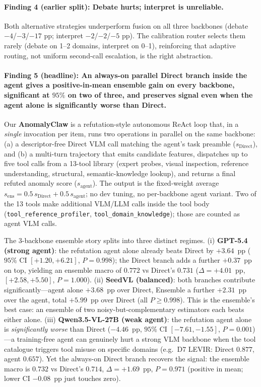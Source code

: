 \paragraph{Finding 4 (earlier split): Debate hurts; interpret is unreliable.}
Both alternative strategies underperform fusion on all three backbones (debate $-4$/$-3$/$-17$ pp; interpret $-2$/$-2$/$-5$ pp). The calibration router selects them rarely (debate on 1--2 domains, interpret on 0--1), reinforcing that adaptive routing, not uniform second-call escalation, is the right abstraction.

\paragraph{Finding 5 (headline): An always-on parallel Direct branch inside the agent gives a positive-in-mean ensemble gain on every backbone, significant at $95\%$ on two of three, and preserves signal even when the agent alone is significantly worse than Direct.}
\label{ssec:finding5}
Our \textbf{AnomalyClaw} is a refutation-style autonomous ReAct loop that, in a \emph{single} invocation per item, runs two operations in parallel on the same backbone: (a) a descriptor-free Direct VLM call matching the agent's task preamble ($s_{\mathrm{Direct}}$), and (b) a multi-turn trajectory that emits candidate features, dispatches up to five tool calls from a 13-tool library (expert probes, visual inspection, reference understanding, structural, semantic-knowledge lookup), and returns a final refuted anomaly score ($s_{\mathrm{agent}}$). The output is the fixed-weight average $s_{\mathrm{ens}} = 0.5\,s_{\mathrm{Direct}} + 0.5\,s_{\mathrm{agent}}$; no dev tuning, no per-backbone agent variant. Two of the 13 tools make additional VLM/LLM calls inside the tool body (\texttt{tool\_reference\_profiler}, \texttt{tool\_domain\_knowledge}); those are counted as agent VLM calls.

The 3-backbone ensemble story splits into three distinct regimes. (i) \textbf{GPT-5.4 (strong agent)}: the refutation agent alone already beats Direct by $+3.64$~pp ($95\%$ CI $[+1.20,+6.21]$, $P{=}0.998$); the Direct branch adds a further $+0.37$~pp on top, yielding an ensemble macro of $0.772$ vs Direct's $0.731$ ($\Delta{=}+4.01$~pp, $[+2.58,+5.50]$, $P{=}1.000$). (ii) \textbf{SeedVL (balanced)}: both branches contribute significantly---agent alone $+3.68$~pp over Direct, Ensemble a further $+2.31$~pp over the agent, total $+5.99$~pp over Direct (all $P{\ge}0.998$). This is the ensemble's best case: an ensemble of two noisy-but-complementary estimators each beats either alone. (iii) \textbf{Qwen3.5-VL-27B (weak agent)}: the refutation agent alone is \emph{significantly worse} than Direct ($-4.46$~pp, $95\%$ CI $[-7.61,-1.55]$, $P{=}0.001$)---a training-free agent can genuinely hurt a strong VLM backbone when the tool catalogue triggers tool misuse on specific domains (e.g.\ D7 LEVIR: Direct $0.877$, agent $0.657$). Yet the always-on Direct branch recovers the signal: the ensemble macro is $0.732$ vs Direct's $0.714$, $\Delta{=}+1.69$~pp, $P{=}0.971$ (positive in mean; lower CI $-0.08$~pp just touches zero).

